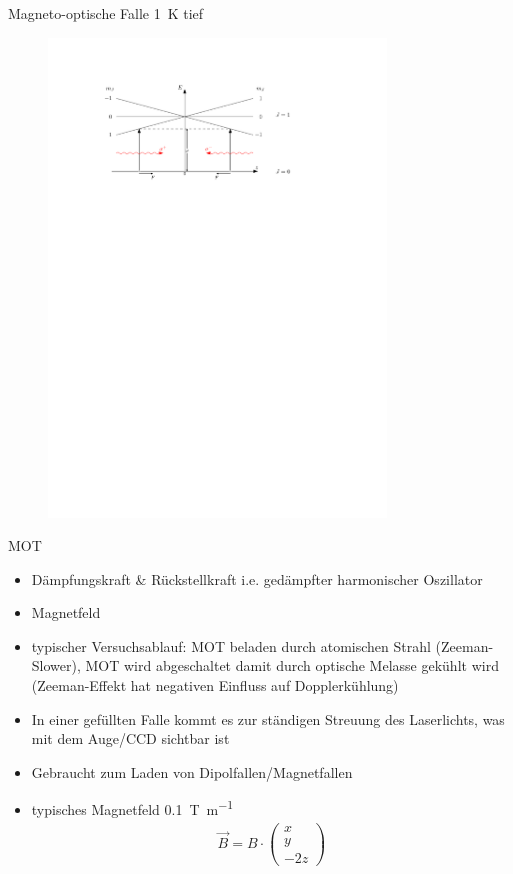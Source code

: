 \documentclass[12pt,xcolor=dvipsnames]{beamer}
\begin{document}
\begin{frame}{Magneto-optische Falle}
\SI{1}{K} tief

\begin{figure}[h]
	\centering
	\includegraphics[width=0.8\textwidth]{./figures/mot.pdf}
\end{figure}
\end{frame}

\begin{frame}{MOT}
	\begin{itemize}
		\item Dämpfungskraft \& Rückstellkraft i.e. gedämpfter harmonischer Oszillator
		\item Magnetfeld
		\item typischer Versuchsablauf: MOT beladen durch atomischen Strahl (Zeeman-Slower), MOT wird abgeschaltet damit durch optische Melasse gekühlt wird (Zeeman-Effekt hat negativen Einfluss auf Dopplerkühlung)
		\item In einer gefüllten Falle kommt es zur ständigen Streuung des Laserlichts, was mit dem Auge/CCD sichtbar ist
		\item Gebraucht zum Laden von Dipolfallen/Magnetfallen
		\item typisches Magnetfeld \SI{0.1}{\tesla\per\metre}
		\begin{align}
		\vec{B} = B \cdot \begin{pmatrix}
		x \\ y \\ -2z
		\end{pmatrix}
		\end{align}
	\end{itemize}
\end{frame}
\end{document}
